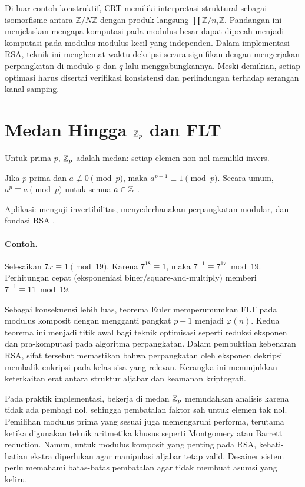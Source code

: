 \documentclass[../main.tex]{subfiles}
\begin{document}
Di luar contoh konstruktif, CRT memiliki interpretasi struktural sebagai isomorfisme antara \(\mathbb{Z}/N\mathbb{Z}\) dengan produk langsung \(\prod \mathbb{Z}/n_i\mathbb{Z}\). Pandangan ini menjelaskan mengapa komputasi pada modulus besar dapat dipecah menjadi komputasi pada modulus-modulus kecil yang independen. Dalam implementasi RSA, teknik ini menghemat waktu dekripsi secara signifikan dengan mengerjakan perpangkatan di modulo \(p\) dan \(q\) lalu menggabungkannya. Meski demikian, setiap optimasi harus disertai verifikasi konsistensi dan perlindungan terhadap serangan kanal samping.

\section{Medan Hingga \(\mathbb{Z}_p\) dan FLT}
Untuk prima \(p\), \(\mathbb{Z}_p\) adalah medan: setiap elemen non-nol memiliki invers.
\begin{theorem}
Jika \(p\) prima dan \(a\not\equiv 0\pmod p\), maka \(a^{p-1}\equiv 1\pmod p\). Secara umum, \(a^p\equiv a\pmod p\) untuk semua \(a\in\mathbb{Z}\) \citep{rosen}.
\end{theorem}
Aplikasi: menguji invertibilitas, menyederhanakan perpangkatan modular, dan fondasi RSA \citep{rsa}.

\paragraph{Contoh.} Selesaikan \(7x\equiv 1\pmod{19}\). Karena \(7^{18}\equiv 1\), maka \(7^{-1}\equiv 7^{17} \bmod 19\). Perhitungan cepat (eksponeniasi biner/square-and-multiply) memberi \(7^{-1}\equiv 11\bmod 19\).

Sebagai konsekuensi lebih luas, teorema Euler memperumumkan FLT pada modulus komposit dengan mengganti pangkat \(p-1\) menjadi \(\varphi(n)\). Kedua teorema ini menjadi titik awal bagi teknik optimisasi seperti reduksi eksponen dan pra-komputasi pada algoritma perpangkatan. Dalam pembuktian kebenaran RSA, sifat tersebut memastikan bahwa perpangkatan oleh eksponen dekripsi membalik enkripsi pada kelas sisa yang relevan. Kerangka ini menunjukkan keterkaitan erat antara struktur aljabar dan keamanan kriptografi.

Pada praktik implementasi, bekerja di medan \(\mathbb{Z}_p\) memudahkan analisis karena tidak ada pembagi nol, sehingga pembatalan faktor sah untuk elemen tak nol. Pemilihan modulus prima yang sesuai juga memengaruhi performa, terutama ketika digunakan teknik aritmetika khusus seperti Montgomery atau Barrett reduction. Namun, untuk modulus komposit yang penting pada RSA, kehati-hatian ekstra diperlukan agar manipulasi aljabar tetap valid. Desainer sistem perlu memahami batas-batas pembatalan agar tidak membuat asumsi yang keliru.
\end{document}
